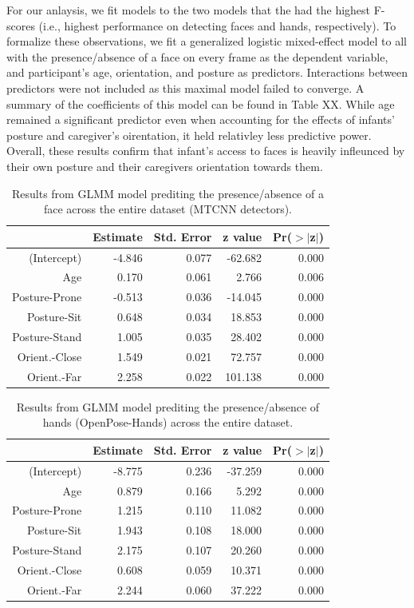 \documentclass[10pt, letterpaper]{article}
\begin{document}
For our anlaysis, we fit models to the two models that the had the
highest F-scores (i.e., highest performance on detecting faces and
hands, respectively). To formalize these observations, we fit a
generalized logistic mixed-effect model to all with the presence/absence
of a face on every frame as the dependent variable, and participant's
age, orientation, and posture as predictors. Interactions between
predictors were not included as this maximal model failed to converge. A
summary of the coefficients of this model can be found in Table XX.
While age remained a significant predictor even when accounting for the
effects of infants' posture and caregiver's oirentation, it held
relativley less predictive power. Overall, these results confirm that
infant's access to faces is heavily infleunced by their own posture and
their caregivers orientation towards them.

\begin{table}[H]
\centering
\begin{tabular}{rrrrr}
  \hline
 & Estimate & Std. Error & z value & Pr($>$$|$z$|$) \\ 
  \hline
(Intercept) & -4.846 & 0.077 & -62.682 & 0.000 \\ 
  Age & 0.170 & 0.061 & 2.766 & 0.006 \\ 
  Posture-Prone & -0.513 & 0.036 & -14.045 & 0.000 \\ 
  Posture-Sit & 0.648 & 0.034 & 18.853 & 0.000 \\ 
  Posture-Stand & 1.005 & 0.035 & 28.402 & 0.000 \\ 
  Orient.-Close & 1.549 & 0.021 & 72.757 & 0.000 \\ 
  Orient.-Far & 2.258 & 0.022 & 101.138 & 0.000 \\ 
   \hline
\end{tabular}
\caption{Results from GLMM model prediting the presence/absence of a face across the entire dataset (MTCNN detectors).} 
\end{table}

\begin{table}[H]
\centering
\begin{tabular}{rrrrr}
  \hline
 & Estimate & Std. Error & z value & Pr($>$$|$z$|$) \\ 
  \hline
(Intercept) & -8.775 & 0.236 & -37.259 & 0.000 \\ 
  Age & 0.879 & 0.166 & 5.292 & 0.000 \\ 
  Posture-Prone  & 1.215 & 0.110 & 11.082 & 0.000 \\ 
  Posture-Sit & 1.943 & 0.108 & 18.000 & 0.000 \\ 
  Posture-Stand  & 2.175 & 0.107 & 20.260 & 0.000 \\ 
  Orient.-Close  & 0.608 & 0.059 & 10.371 & 0.000 \\ 
  Orient.-Far & 2.244 & 0.060 & 37.222 & 0.000 \\ 
   \hline
\end{tabular}
\caption{Results from GLMM model prediting the presence/absence of hands (OpenPose-Hands) across the entire dataset.} 
\end{table}
\end{document}
